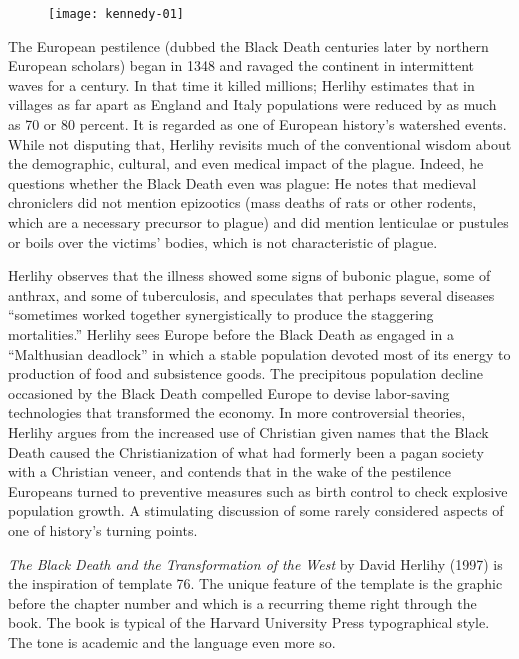 \begin{figure}[ht]
\centering
\texttt{[image: kennedy-01]}
\end{figure}

The European pestilence (dubbed the Black Death centuries later by northern European scholars) began in 1348 and ravaged the continent in intermittent waves for a century. In that time it killed millions; Herlihy estimates that in villages as far apart as England and Italy populations were reduced by as much as 70 or 80 percent. It is regarded as one of European history's watershed events. While not disputing that, Herlihy revisits much of the conventional wisdom about the demographic, cultural, and even medical impact of the plague. Indeed, he questions whether the Black Death even was plague: He notes that medieval chroniclers did not mention epizootics (mass deaths of rats or other rodents, which are a necessary precursor to plague) and did mention lenticulae or pustules or boils over the victims' bodies, which is not characteristic of plague. 

Herlihy observes that the illness showed some signs of bubonic plague, some of anthrax, and some of tuberculosis, and speculates that perhaps several diseases ``sometimes worked together synergistically to produce the staggering mortalities.'' Herlihy sees Europe before the Black Death as engaged in a ``Malthusian deadlock'' in which a stable population devoted most of its energy to production of food and subsistence goods. The precipitous population decline occasioned by the Black Death compelled Europe to devise labor-saving technologies that transformed the economy. In more controversial theories, Herlihy argues from the increased use of Christian given names that the Black Death caused the Christianization of what had formerly been a pagan society with a Christian veneer, and contends that in the wake of the pestilence Europeans turned to preventive measures such as birth control to check explosive population growth. A stimulating discussion of some rarely considered aspects of one of history's turning points.

\emph{The Black Death and the Transformation of the West} by David Herlihy (1997) is the inspiration of template 76. The unique feature of the template is the graphic before the chapter number and which is a recurring theme right through the book. The book is typical of the Harvard University Press typographical style. The tone is academic and the language even more so. 

